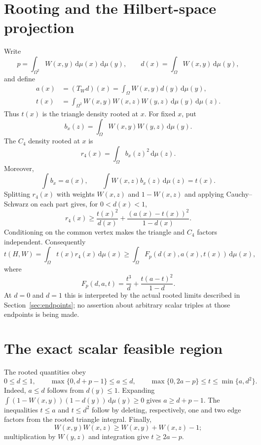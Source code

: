 \documentclass[11pt]{article}
\newcommand{\dd}{\,\mathrm d}
\begin{document}
\section{Rooting and the Hilbert-space projection}

Write
\[
 p=\int_{\Omega^2}W(x,y)\dd\mu(x)\dd\mu(y),\qquad
 d(x)=\int_\Omega W(x,y)\dd\mu(y),
\]
and define
\begin{align*}
 a(x)&=(T_Wd)(x)=\int_\Omega W(x,y)d(y)\dd\mu(y),\\
 t(x)&=\int_{\Omega^2}W(x,y)W(x,z)W(y,z)
       \dd\mu(y)\dd\mu(z).
\end{align*}
Thus $t(x)$ is the triangle density rooted at $x$.  For fixed $x$, put
\[
 b_x(z)=\int_\Omega W(x,y)W(y,z)\dd\mu(y).
\]
The $C_4$ density rooted at $x$ is
\[
 r_4(x)=\int_\Omega b_x(z)^2\dd\mu(z).
\]
Moreover,
\[
 \int b_x=a(x),\qquad
 \int W(x,z)b_x(z)\dd\mu(z)=t(x).
\]
Splitting $r_4(x)$ with weights $W(x,z)$ and $1-W(x,z)$ and applying
Cauchy--Schwarz on each part gives, for $0<d(x)<1$,
\begin{equation}
 r_4(x)\ge \frac{t(x)^2}{d(x)}
 +\frac{(a(x)-t(x))^2}{1-d(x)}.
 \label{eq:projection}
\end{equation}
Conditioning on the common vertex makes the triangle and $C_4$ factors
independent.  Consequently
\begin{equation}
 t(H,W)=\int_\Omega t(x)r_4(x)\dd\mu(x)
 \ge\int_\Omega F_p(d(x),a(x),t(x))\dd\mu(x),
 \label{eq:rooted-reduction}
\end{equation}
where
\begin{equation}
 F_p(d,a,t)=\frac{t^3}{d}+\frac{t(a-t)^2}{1-d}.
 \label{eq:F}
\end{equation}
At $d=0$ and $d=1$ this is interpreted by the actual rooted limits described
in Section~\ref{sec:endpoints}; no assertion about arbitrary scalar triples
at those endpoints is being made.

\section{The exact scalar feasible region}

The rooted quantities obey
\begin{equation}
 0\le d\le1,\qquad
 \max\{0,d+p-1\}\le a\le d,\qquad
 \max\{0,2a-p\}\le t\le\min\{a,d^2\}.
 \label{eq:feasible}
\end{equation}
Indeed, $a\le d$ follows from $d(y)\le1$.  Expanding
$\int(1-W(x,y))(1-d(y))\dd\mu(y)\ge0$ gives $a\ge d+p-1$.
The inequalities $t\le a$ and $t\le d^2$ follow by deleting, respectively,
one and two edge factors from the rooted triangle integral.  Finally,
\[
 W(x,y)W(x,z)\ge W(x,y)+W(x,z)-1;
\]
multiplication by $W(y,z)$ and integration give $t\ge2a-p$.
\end{document}
